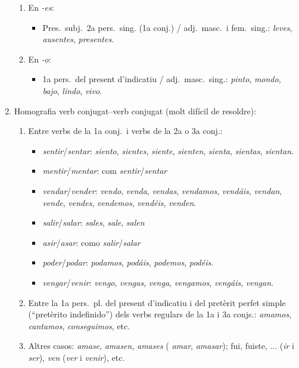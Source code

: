 \begin{enumerate}
\begin{enumerate}
   \item En \emph{-es}: 
   \begin{itemize}
   \item Pres.\ subj.\ 2a pers.\ sing. (1a conj.) / adj.\ masc.\ i fem.\
     sing.: \emph{leves}, \emph{ausentes}, \emph{presentes}.
   \end{itemize}

   \item En \emph{-o}: 
   \begin{itemize}
     \item 1a pers.\ del
      present d'indicatiu / adj.\ masc.\ sing.: \emph{pinto}, \emph{mondo}, \emph{bajo}, \emph{lindo},  \emph{vivo}.
   \end{itemize}  

\end{enumerate}

\item Homografia verb conjugat--verb conjugat (molt difícil de resoldre):
\begin{enumerate}
\item Entre verbs de la 1a conj.\ i verbs de la 2a o 3a conj.:
  \begin{itemize}
  \item \emph{sentir}/\emph{sentar}: \emph{siento}, \emph{sientes}, {\em
      siente}, \emph{sienten}, \emph{sienta}, \emph{sientas}, \emph{ sientan}.
  \item \emph{mentir}/\emph{mentar}: com \emph{sentir}/\emph{sentar}
  \item \emph{vendar}/\emph{vender}: \emph{vendo}, \emph{venda}, {\em
      vendas}, \emph{vendamos}, \emph{vendáis}, \emph{vendan},
    \emph{vende}, \emph{vendes}, \emph{vendemos}, \emph{vendéis}, {\em
      venden}.
  \item \emph{salir}/\emph{salar}: \emph{sales}, \emph{sale}, \emph{salen}
  \item \emph{asir}/\emph{asar}: como \emph{salir}/\emph{salar}
  \item \emph{poder}/\emph{podar}: \emph{podamos}, \emph{podáis}, {\em
      podemos}, \emph{podéis}.
  \item \emph{vengar}/\emph{venir}: \emph{vengo}, \emph{vengas}, {\em
      venga}, \emph{vengamos}, \emph{vengáis}, \emph{vengan}.
  \end{itemize}

\item  Entre la 1a pers.\ pl. del present d'indicatiu i del pretèrit perfet
     simple (``pretèrito indefinido'') dels verbs regulars de la 1a i
     3a conjs.: {\em
       amamos}, \emph{cantamos}, \emph{conseguimos}, etc.
\item Altres casos: \emph{amase},  \emph{amasen}, \emph{amases} ({\em
    amar}, \emph{amasar}); fui, fuiste, ... (\emph{ir} i \emph{ser}),
  \emph{ven} (\emph{ver} i \emph{venir}), etc.
\end{enumerate}



\end{enumerate}
